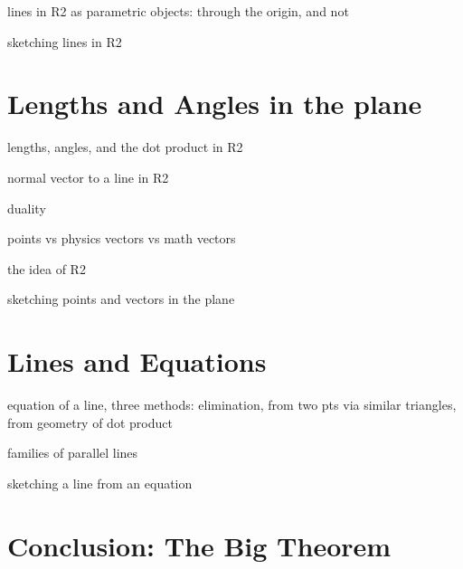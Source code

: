 \documentclass[00-livre-main.tex]{subfiles}
\begin{document}
\begin{compactitem}
\item lines in R2 as parametric objects: through the origin, and not
\item sketching lines in R2
\end{compactitem}

\section*{Lengths and Angles in the plane}
\begin{compactitem}
\item lengths, angles, and the dot product in R2
\item normal vector to a line in R2
\item duality
\end{compactitem}


\begin{compactitem}
\item points vs physics vectors vs math vectors
\item the idea of R2
\item sketching points and vectors in the plane
\end{compactitem}


\section*{Lines and Equations}
\begin{compactitem}
\item equation of a line, three methods: elimination, from two pts via similar triangles, from geometry of dot product
\item families of parallel lines
\item sketching a line from an equation
\end{compactitem}

\section*{Conclusion: The Big Theorem}
\end{document}
